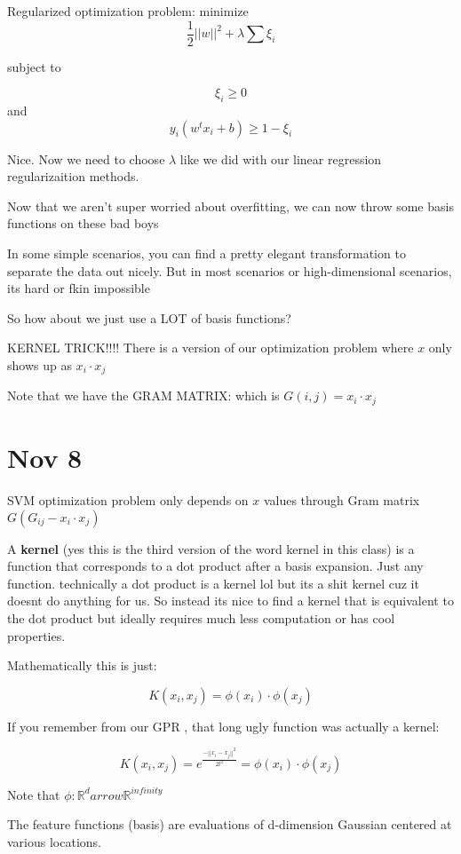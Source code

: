 \documentclass[12pt]{article}
\begin{document}
Regularized optimization problem: 
minimize  $$\frac{1}{2} ||w||^2 + \lambda \sum \xi_i$$ 

subject to 

$$ \xi_i \geq 0$$ and $$ y_i(w^tx_i + b) \geq 1 - \xi_i$$

Nice. Now we need to choose $\lambda$ like we did with our linear regression regularizaition methods.

Now that we aren't super worried about overfitting, we can now throw some basis functions on these bad boys

In some simple scenarios, you can find a pretty elegant transformation to separate the data out nicely. But in most scenarios or high-dimensional scenarios, its hard or fkin impossible

So how about we just use a LOT of basis functions?

KERNEL TRICK!!!! There is a version of our optimization problem where $x$ only shows up as $x_i \cdot x_j$

Note that we have the GRAM MATRIX: which is $G(i,j) = x_i \cdot x_j$


\section{Nov 8}
SVM optimization problem only depends on $x$ values through Gram matrix $G(G_{ij}-x_i \cdot x_j)$

A \textbf{kernel} (yes this is the third version of the word kernel in this class) is a function that corresponds to a dot product after a basis expansion. Just any function. technically a dot product is a kernel lol but its a shit kernel cuz it doesnt do anything for us. So instead its nice to find a kernel that is equivalent to the dot product but ideally requires much less computation or has cool properties. 

Mathematically this is just:

$$ K(x_i,x_j) = \phi(x_i) \cdot \phi(x_j) $$

If you remember from our GPR , that long ugly function was actually a kernel:

$$ K(x_i,x_j) = e^{\frac{-||x_i-x_j||^2}{2l^2}} = \phi(x_i) \cdot \phi(x_j) $$

Note that $\phi : \mathbb{R}^d arrow \mathbb{R}^{infinity}$

The feature functions (basis) are evaluations of d-dimension Gaussian centered at various locations.
\end{document}

